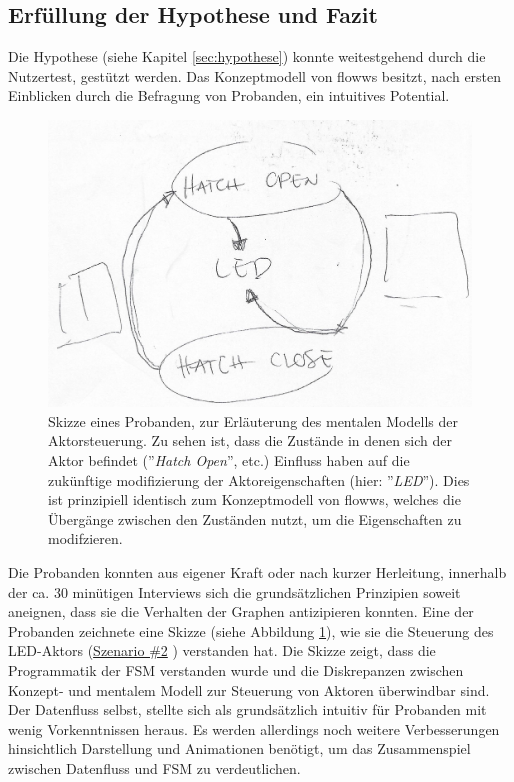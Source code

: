 \subsection{Erfüllung der Hypothese und Fazit}
Die Hypothese (siehe Kapitel \ref{sec:hypothese}) konnte weitestgehend durch die Nutzertest, gestützt werden. Das Konzeptmodell von flowws besitzt, nach ersten Einblicken durch die Befragung von Probanden, ein intuitives Potential.

\begin{figure}[h]
    \centering
    \includegraphics[width=.7\textwidth]{bilder/chapter5/joanna.jpg}
    \caption{Skizze eines Probanden, zur Erläuterung des mentalen Modells der Aktorsteuerung. Zu sehen ist, dass die Zustände in denen sich der Aktor befindet (''\textit{Hatch Open}'', etc.) Einfluss haben auf die zukünftige modifizierung der Aktoreigenschaften (hier: ''\textit{LED}'').  Dies ist prinzipiell identisch zum Konzeptmodell von flowws, welches die Übergänge zwischen den Zuständen nutzt, um die Eigenschaften zu modifzieren.}
    \label{fig:enduserskizze}
\end{figure}

Die Probanden konnten aus eigener Kraft oder nach kurzer Herleitung, innerhalb der ca. 30 minütigen Interviews sich die grundsätzlichen Prinzipien soweit aneignen, dass sie die Verhalten der Graphen antizipieren konnten. Eine der Probanden zeichnete eine Skizze (siehe Abbildung \ref{fig:enduserskizze}), wie sie die Steuerung des LED-Aktors (\hyperref[szenario2]{Szenario \#2} ) verstanden hat. Die Skizze zeigt, dass die Programmatik der \ac{FSM} verstanden wurde und die Diskrepanzen zwischen Konzept- und mentalem Modell zur Steuerung von Aktoren überwindbar sind. Der Datenfluss selbst, stellte sich als grundsätzlich intuitiv für Probanden mit wenig Vorkenntnissen heraus. Es werden allerdings noch weitere Verbesserungen hinsichtlich Darstellung und Animationen benötigt, um das Zusammenspiel zwischen Datenfluss und \ac{FSM} zu verdeutlichen.

